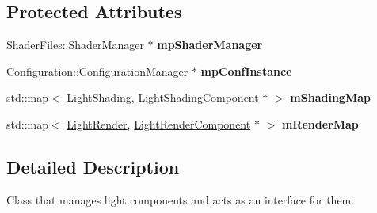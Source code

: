 \subsection*{Protected Attributes}
\begin{DoxyCompactItemize}
\item 
\mbox{\label{class_geometry_engine_1_1_light_utils_1_1_light_component_manager_a92502bce6a2b170590e8ff080f8efb98}} 
\mbox{\hyperlink{class_shader_files_1_1_shader_manager}{Shader\+Files\+::\+Shader\+Manager}} $\ast$ {\bfseries mp\+Shader\+Manager}
\item 
\mbox{\label{class_geometry_engine_1_1_light_utils_1_1_light_component_manager_a08607395b8258e1d533eb63aa0009e02}} 
\mbox{\hyperlink{class_configuration_1_1_configuration_manager}{Configuration\+::\+Configuration\+Manager}} $\ast$ {\bfseries mp\+Conf\+Instance}
\item 
\mbox{\label{class_geometry_engine_1_1_light_utils_1_1_light_component_manager_ad2f5a370cb22b752ab44464b0bf53f51}} 
std\+::map$<$ \mbox{\hyperlink{namespace_geometry_engine_1_1_light_utils_a16eb370137c2fd151e6f8e1d07cd23e0}{Light\+Shading}}, \mbox{\hyperlink{class_geometry_engine_1_1_light_utils_1_1_light_shading_component}{Light\+Shading\+Component}} $\ast$ $>$ {\bfseries m\+Shading\+Map}
\item 
\mbox{\label{class_geometry_engine_1_1_light_utils_1_1_light_component_manager_a930d39bce6d0fbbfd2ba7a1bfeb20e59}} 
std\+::map$<$ \mbox{\hyperlink{namespace_geometry_engine_1_1_light_utils_ac3078de660742daceaa06bd9bc61d24a}{Light\+Render}}, \mbox{\hyperlink{class_geometry_engine_1_1_light_utils_1_1_light_render_component}{Light\+Render\+Component}} $\ast$ $>$ {\bfseries m\+Render\+Map}
\end{DoxyCompactItemize}


\subsection{Detailed Description}
Class that manages light components and acts as an interface for them. 

